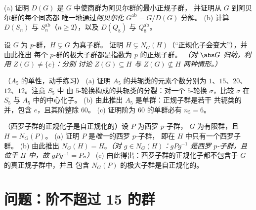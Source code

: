 \begin{exercise}[$\star\star$]\label{exo:b3:groups:9}
(a) 证明 $D(G)$ 是 $G$ 中使商群为阿贝尔群的最小正规子群，
并证明从 $G$ 到阿贝尔群的每个同态都
唯一地通过\emph{阿贝尔化}
$G^{\mathrm{ab}} = G/D(G)$ 分解。
(b) 计算 $D(S_n)$ 与 $S_n^{\mathrm{ab}}$（$n \geq 2$），以及
$D(Q_8)$ 与 $Q_8^{\mathrm{ab}}$。
\end{exercise}

\begin{exercise}[$\star\star$]\label{exo:b3:groups:10}
设 $G$ 为 $p$-群，$H \subsetneq G$ 为真子群。
证明 $H \subsetneq N_G(H)$（“正规化子会变大”），并由此推出
每个 $p$-群的极大子群都是指数为 $p$ 的正规子群。
\emph{（对 $\abs G$ 归纳，利用 $Z(G) \neq \{e\}$：分别
讨论 $Z(G) \subseteq H$ 与 $Z(G) \not\subseteq H$ 两种情形。）}
\end{exercise}

\begin{exercise}[$\star\star\star$]\label{exo:b3:groups:11}
（$A_5$ 的单性，动手练习）
(a) 证明 $A_5$ 的共轭类的元素个数分别为
$1$、$15$、$20$、$12$、$12$。注意 $S_5$ 中
由 $5$-轮换构成的共轭类的分裂：对一个 $5$-轮换 $\sigma$，比较
$\sigma$ 在 $S_5$ 与 $A_5$ 中的中心化子。
(b) 由此推出 $A_5$ 是单群：正规子群是若干
共轭类的并，包含 $e$，且其阶整除
$60$。
(c) 证明阶为 $60$ 的单群必有 $n_5 =
6$。
\end{exercise}

\begin{exercise}[$\star\star$]\label{exo:b3:groups:12}
（西罗子群的正规化子是自正规化的）设 $P$ 为西罗 $p$-子群，
$G$ 为有限群，且 $H =
N_G(P)$。
(a) 证明 $P$ 是\emph{唯一}的西罗 $p$-子群，
即在 $H$ 中只有一个西罗子群。
(b) 由此推出 $N_G(H) = H$。\emph{（对 $g \in N_G(H)$：$gPg^{-1}$
是西罗 $p$-子群，且位于 $H$ 中，故 $gPg^{-1} = P$。）}
(c) 由此得出：西罗子群的正规化子都不包含于
$G$ 的真正规子群中，并且
包含 $N_G(P)$ 的极大子群是自正规化的。
\end{exercise}

\section{问题：阶不超过 15 的群}

